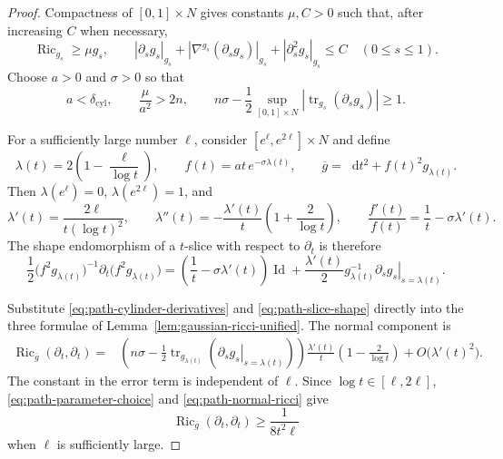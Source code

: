 \documentclass[11pt,reqno]{amsart}
\theoremstyle{definition}
\numberwithin{equation}{section}
\DeclareMathOperator{\Ric}{Ric}
\DeclareMathOperator{\tr}{tr}
\DeclareMathOperator{\Id}{Id}
\newcommand{\dd}{\mathop{}\!\mathrm d}
\begin{document}
\begin{proof}
Compactness of $[0,1]\times N$ gives constants $\mu,C>0$ such that,
after increasing $C$ when necessary,
\begin{equation}
 \Ric_{g_s}\ge\mu g_s,
 \qquad
 |\partial_sg_s|_{g_s}
 +|\nabla^{g_s}(\partial_sg_s)|_{g_s}
 +|\partial_s^2g_s|_{g_s}\le C
 \quad (0\le s\le1).
 \label{eq:path-uniform-bounds}
\end{equation}
Choose $a>0$ and $\sigma>0$ so that
\begin{equation}
 a<\delta_{\mathrm{cyl}},
 \qquad \frac{\mu}{a^2}>2n,
 \qquad
 n\sigma-\frac12\sup_{[0,1]\times N}
   |\tr_{g_s}(\partial_sg_s)|\ge1.
 \label{eq:path-parameter-choice}
\end{equation}

For a sufficiently large number $\ell$, consider
$[e^\ell,e^{2\ell}]\times N$ and define
\begin{equation}
 \lambda(t)=2\left(1-\frac{\ell}{\log t}\right),
 \qquad
 f(t)=at\,e^{-\sigma\lambda(t)},
 \qquad
 \overline g=\dd t^2+f(t)^2g_{\lambda(t)}.
 \label{eq:path-cylinder-metric}
\end{equation}
Then $\lambda(e^\ell)=0$, $\lambda(e^{2\ell})=1$, and
\begin{equation}
 \lambda'(t)=\frac{2\ell}{t(\log t)^2},
 \qquad
 \lambda''(t)=-\frac{\lambda'(t)}t
                   \left(1+\frac2{\log t}\right),
 \qquad
 \frac{f'(t)}{f(t)}=\frac1t-\sigma\lambda'(t).
 \label{eq:path-cylinder-derivatives}
\end{equation}
The shape endomorphism of a $t$-slice with respect to $\partial_t$ is
therefore
\begin{equation}
 \frac12\bigl(f^2g_{\lambda(t)}\bigr)^{-1}
       \partial_t\bigl(f^2g_{\lambda(t)}\bigr)
 =\left(\frac1t-\sigma\lambda'(t)\right)\Id
  +\frac{\lambda'(t)}2g_{\lambda(t)}^{-1}
       \left.\partial_sg_s\right|_{s=\lambda(t)}.
 \label{eq:path-slice-shape}
\end{equation}

Substitute \eqref{eq:path-cylinder-derivatives} and
\eqref{eq:path-slice-shape} directly into the three formulae of
Lemma~\ref{lem:gaussian-ricci-unified}.  The normal component is
\begin{align}
 \Ric_{\overline g}(\partial_t,\partial_t)
 ={}&\left(n\sigma-\frac12\tr_{g_{\lambda(t)}}
       \left(\left.\partial_sg_s\right|_{s=\lambda(t)}\right)\right)
       \frac{\lambda'(t)}t\left(1-\frac2{\log t}\right)
       +O\bigl(\lambda'(t)^2\bigr).
 \label{eq:path-normal-ricci}
\end{align}
The constant in the error term is independent of $\ell$.  Since
$\log t\in[\ell,2\ell]$, 
\eqref{eq:path-parameter-choice} and \eqref{eq:path-normal-ricci} give
\begin{equation}
 \Ric_{\overline g}(\partial_t,\partial_t)
 \ge\frac1{8t^2\ell}
 \label{eq:path-normal-lower}
\end{equation}
when $\ell$ is sufficiently large.


\end{proof}
\end{document}
